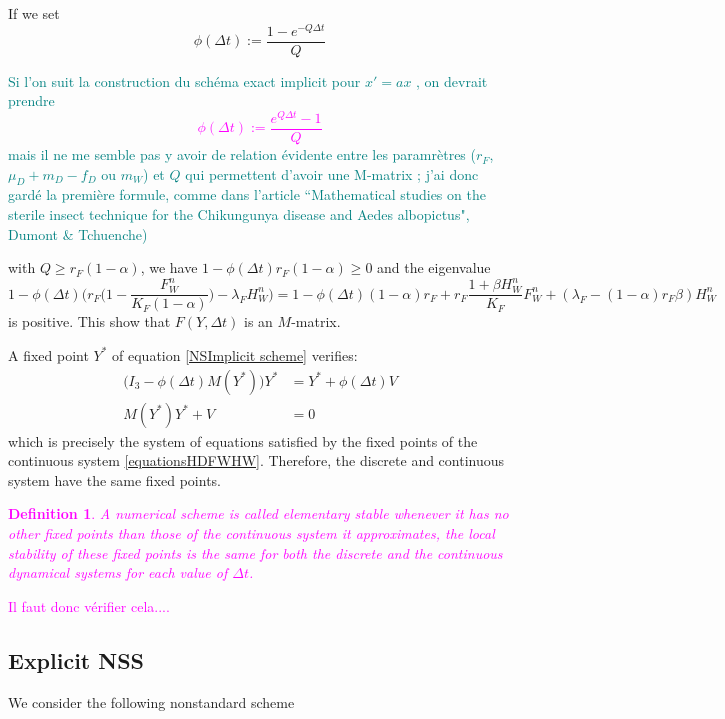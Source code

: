 \documentclass{article}
\newcommand{\lfw}{\lambda_{F}}
\newcommand{\lfw}{\lambda_{F}}
\newcommand{\marc}[1]{\textcolor{teal}{#1}}
\newcommand{\YD}[1]{\textcolor{magenta}{#1}}
\newtheorem{definition}{Definition}
\begin{document}
If we set
\begin{equation}
\phi(\Delta t) := \dfrac{1- e^{-Q \Delta t}}{Q}
\end{equation}

\marc{Si l'on suit la construction du schéma exact implicit pour $x' = a x$ , on devrait prendre
\YD{
\begin{equation}
\phi(\Delta t) := \dfrac{e^{Q \Delta t} - 1}{Q}
\end{equation}}
mais il ne me semble pas y avoir de relation évidente entre les paramrètres ($r_F$, $\mu_D+m_D-f_D$ ou $m_W$) et $Q$ qui permettent d'avoir une M-matrix ; j'ai donc gardé la première formule, comme dans l'article ``Mathematical studies on the sterile insect technique for the Chikungunya disease and Aedes albopictus", Dumont \& Tchuenche)
}

with $Q \geq r_F(1 - \alpha)$, we have $1 - \phi(\Delta t)r_F(1-\alpha) \geq 0$ and the eigenvalue $$1 - \phi(\Delta t) \Big(r_F\Big(1 - \dfrac{F_W^n}{K_F(1 - \alpha)} \Big) - \lfw H_W^n \Big) = 1 - \phi(\Delta t)(1-\alpha)r_F + r_F \dfrac{1 + \beta H_W^n}{K_F}F^n_W + (\lfw - (1-\alpha) r_F  \beta) H^n_W $$ is positive. This show that $F(Y, \Delta t)$ is an $M$-matrix.

\medskip
A fixed point $Y^*$ of equation \eqref{NSImplicit scheme} verifies:
\begin{align*}
\Big(I_3 - \phi(\Delta t) M(Y^*) \Big) Y^* &= Y^* + \phi(\Delta t)V \\
 M(Y^*) Y^* + V&= 0
\end{align*}
which is precisely the system of equations satisfied by the fixed points of the continuous system \eqref{equationsHDFWHW}. Therefore, the discrete and continuous system have the same fixed points.

\YD{
\begin{definition}
A numerical scheme is called elementary stable whenever it has no other fixed points than those of the continuous system it approximates, the local stability of these fixed points is the same for both the discrete and the continuous dynamical systems for each value of $\Delta t$.
\end{definition}
Il faut donc vérifier cela....
}

\subsection{Explicit NSS}
 We consider the following nonstandard scheme
\end{document}

